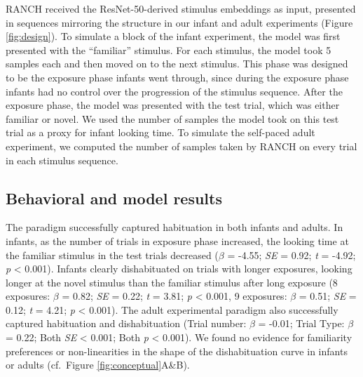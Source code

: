 \documentclass[
]{article}
\begin{document}
RANCH received the ResNet-50-derived stimulus embeddings as input, presented in sequences mirroring the structure in our infant and adult experiments (Figure \ref{fig:design}). To simulate a block of the infant experiment, the model was first presented with the ``familiar'' stimulus. For each stimulus, the model took 5 samples each and then moved on to the next stimulus. This phase was designed to be the exposure phase infants went through, since during the exposure phase infants had no control over the progression of the stimulus sequence. After the exposure phase, the model was presented with the test trial, which was either familiar or novel. We used the number of samples the model took on this test trial as a proxy for infant looking time. To simulate the self-paced adult experiment, we computed the number of samples taken by RANCH on every trial in each stimulus sequence.



\hypertarget{behavioral-and-model-results}{%
\subsection{Behavioral and model results}\label{behavioral-and-model-results}}

The paradigm successfully captured habituation in both infants and adults. In infants, as the number of trials in exposure phase increased, the looking time at the familiar stimulus in the test trials decreased (\(\beta\) = -4.55; \emph{SE} = 0.92; \emph{t} = -4.92; \emph{p} \textless{} 0.001). Infants clearly dishabituated on trials with longer exposures, looking longer at the novel stimulus than the familiar stimulus after long exposure (8 exposures: \(\beta\) = 0.82; \emph{SE} = 0.22; \emph{t} = 3.81; \emph{p} \textless{} 0.001, 9 exposures: \(\beta\) = 0.51; \emph{SE} = 0.12; \emph{t} = 4.21; \emph{p} \textless{} 0.001). The adult experimental paradigm also successfully captured habituation and dishabituation (Trial number: \(\beta\) = -0.01; Trial Type: \(\beta\) = 0.22; Both \emph{SE} \textless{} 0.001; Both \emph{p} \textless{} 0.001). We found no evidence for familiarity preferences or non-linearities in the shape of the dishabituation curve in infants or adults (cf.~Figure \ref{fig:conceptual}A\&B).
\end{document}
